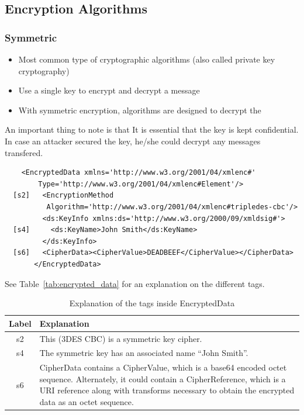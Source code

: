 \subsection{Encryption Algorithms}
\subsubsection{Symmetric}
\begin{itemize}
    \item Most common type of cryptographic algorithms (also called private key
        cryptography)
    \item Use a single key to encrypt and decrypt a message
    \item With symmetric encryption, algorithms are designed to decrypt the
\end{itemize}
An important thing to note is that It is essential that the key is kept
confidential. In case an attacker secured the key, he/she could decrypt any
messages transfered.
\begin{verbatim}
    <EncryptedData xmlns='http://www.w3.org/2001/04/xmlenc#'
        Type='http://www.w3.org/2001/04/xmlenc#Element'/>
  [s2]   <EncryptionMethod
          Algorithm='http://www.w3.org/2001/04/xmlenc#tripledes-cbc'/>
         <ds:KeyInfo xmlns:ds='http://www.w3.org/2000/09/xmldsig#'>
  [s4]     <ds:KeyName>John Smith</ds:KeyName>
         </ds:KeyInfo>
  [s6]   <CipherData><CipherValue>DEADBEEF</CipherValue></CipherData>
       </EncryptedData>
\end{verbatim}
See Table~\vref{tab:encrypted_data} for an explanation on the different tags.

\begin{table}
    \begin{tabulary}{\textwidth}{cL}
        \toprule
        Label & Explanation \\
        \midrule
        s2 & This (3DES CBC) is a symmetric key cipher. \\

        s4 & The symmetric key has an associated name ``John Smith''. \\

        s6 & CipherData contains a CipherValue, which is a base64 encoded octet
        sequence. Alternately, it could contain a CipherReference, which is a
        URI reference along with transforms necessary to obtain the encrypted
        data as an octet sequence. \\
        \bottomrule
    \end{tabulary}
    \caption{Explanation of the tags inside
    EncryptedData}\label{tab:encrypted_data}
\end{table}

